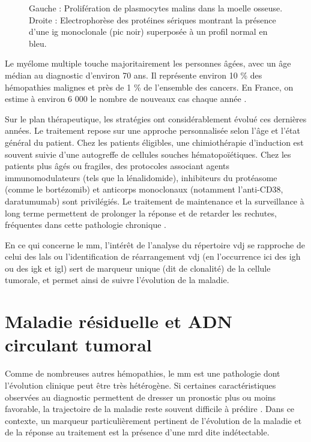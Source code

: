 \begin{figure}[H]
\begin{minipage}{0.45\textwidth}
    \end{minipage}
    \caption{Gauche : Prolifération de plasmocytes malins dans la moelle osseuse. 
    Droite : Electrophorèse des protéines sériques montrant la présence d'une \gls{ig} monoclonale (pic noir) 
    superposée à un profil normal en bleu.}
    \label{fig:mm-cells-ig}
\end{figure}

Le myélome multiple touche majoritairement les personnes âgées, avec un âge médian au diagnostic d'environ 70 ans. Il représente environ 10 \%
des hémopathies malignes et près de 1 \% de l'ensemble des cancers. En France, on estime à environ 6 000 le nombre de nouveaux cas chaque année 
\cite{spfSurviePersonnesAtteintes}.

\vspace{1em}

Sur le plan thérapeutique, les stratégies ont considérablement évolué ces dernières années. Le traitement repose sur une approche personnalisée
selon l'âge et l'état général du patient. Chez les patients éligibles, une chimiothérapie d'induction est souvent suivie d'une autogreffe de cellules
souches hématopoïétiques. Chez les patients plus âgés ou fragiles, des protocoles associant agents immunomodulateurs (tels que la lénalidomide),
inhibiteurs du protéasome (comme le bortézomib) et anticorps monoclonaux (notamment l'anti-CD38, daratumumab) sont privilégiés. Le traitement de
maintenance et la surveillance à long terme permettent de prolonger la réponse et de retarder les rechutes, fréquentes dans cette pathologie chronique 
\cite{cowanDiagnosisManagementMultiple2022a}.

\vspace{1em}

En ce qui concerne le \gls{mm}, l'intérêt de l'analyse du répertoire \gls{vdj} se rapproche de celui des \glspl{lal} ou l'identification 
de réarrangement \gls{vdj} (en l'occurrence ici des \gls{igh} ou des \gls{igk} et \gls{igl}) sert de marqueur unique (dit de clonalité) 
de la cellule tumorale, et permet ainsi de suivre l'évolution de la maladie.

\section{Maladie résiduelle et ADN circulant tumoral}

Comme de nombreuses autres hémopathies, le \gls{mm} est une pathologie dont l'évolution clinique peut être très hétérogène. 
Si certaines caractéristiques observées au diagnostic permettent de dresser un pronostic plus ou moins favorable, 
la trajectoire de la maladie reste souvent difficile à prédire \cite{hanamuraMultipleMyelomaHighrisk2022}. 
Dans ce contexte, un marqueur particulièrement pertinent de l'évolution de la maladie et de la réponse au traitement 
est la présence d'une \gls{mrd} dite indétectable.

